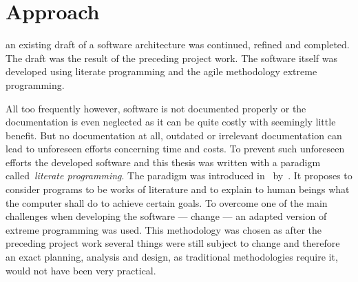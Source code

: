 
\section{Approach}

 an existing draft of a software
architecture was continued, refined and completed. The draft was the result of
the preceding project work. The software itself was developed using literate
programming and the agile methodology extreme programming.

 All too frequently however,
software is not documented properly or the documentation is even neglected as it
can be quite costly with seemingly little benefit. But no documentation at all,
outdated or irrelevant documentation can lead to unforeseen efforts concerning
time and costs. To prevent such unforeseen efforts the developed software and
this thesis was written with a paradigm called~\emph{literate programming}. The
paradigm was introduced in~\citeyear{knuth-lp-1984}
by~\citeauthor{knuth-lp-1984}. It proposes to consider programs to be works of
literature and to explain to human beings what the computer shall do to achieve
certain goals. To overcome one of the main challenges when developing the software
--- change --- an adapted version of extreme programming was used. This
methodology was chosen as after the preceding project work several things were
still subject to change and therefore an exact planning, analysis and design, as
traditional methodologies require it, would not have been very practical.
